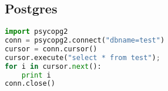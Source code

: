 \subsection{Postgres}
\lstset{basicstyle=\scriptsize, numbers=left, captionpos=b, tabsize=4}
\begin{lstlisting}[caption=Postgres Example,language={Python},
xleftmargin=15pt, label=lst:postgresexample]
import psycopg2
conn = psycopg2.connect("dbname=test")
cursor = conn.cursor()
cursor.execute("select * from test");
for i in cursor.next():
    print i
conn.close()
\end{lstlisting}
